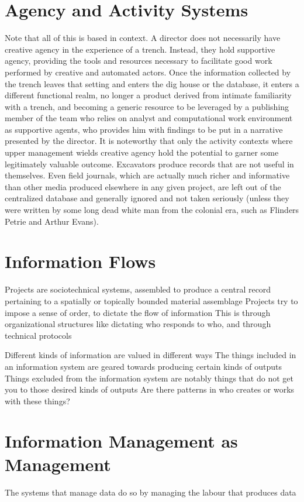 \documentclass{article}
\begin{document}
\section{Agency and Activity Systems}
Note that all of this is based in context.
A director does not necessarily have creative agency in the experience of a trench. Instead, they hold supportive agency, providing the tools and resources necessary to facilitate good work performed by creative and automated actors. Once the information collected by the trench leaves that setting and enters the dig house or the database, it enters a different functional realm, no longer a product derived from intimate familiarity with a trench, and becoming a generic resource to be leveraged by a publishing member of the team who relies on analyst and computational work environment as supportive agents, who provides him with findings to be put in a narrative presented by the director.
It is noteworthy that only the activity contexts where upper management wields creative agency hold the potential to garner some legitimately valuable outcome. Excavators produce records that are not useful in themselves. Even field journals, which are actually much richer and informative than other media produced elsewhere in any given project, are left out of the centralized database and generally ignored and not taken seriously (unless they were written by some long dead white man from the colonial era, such as Flinders Petrie and Arthur Evans).

\section{Information Flows}
Projects are sociotechnical systems, assembled to produce a central record pertaining to a spatially or topically bounded material assemblage
Projects try to impose a sense of order, to dictate the flow of information
This is through organizational structures like dictating who responds to who, and through technical protocols

Different kinds of information are valued in different ways
The things included in an information system are geared towards producing certain kinds of outputs
Things excluded from the information system are notably things that do not get you to those desired kinds of outputs
Are there patterns in who creates or works with these things?

\section{Information Management as Management}
The systems that manage data do so by managing the labour that produces data
\end{document}
